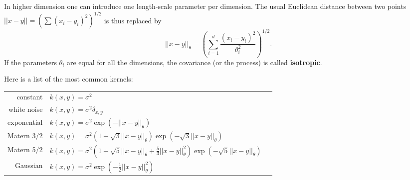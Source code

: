 \documentclass{beamer}
\newcommand\Ni[2]{{|| #1 ||}_{\! #2}}
\begin{document}
\begin{frame}{}
In higher dimension one can introduce one length-scale parameter per dimension. The usual Euclidean distance between two points $|| x-y || = ( \sum (x_i-y_i)^2)^{1/2}$ is thus replaced by
\begin{equation*}
	\Ni{x-y}{\theta} = \left( \sum_{i=1}^d \frac{(x_i-y_i)^2}{\theta_i^2} \right)^{1/2}.
\end{equation*}
If the parameters $\theta_i$ are equal for all the dimensions, the covariance (or the process) is called \textbf{isotropic}.
\end{frame}

\begin{frame}{}
Here is a list of the most common kernels:\\
\vspace{2mm}
\footnotesize
\centering
\begin{tabular}{rlN}
		constant & $ \displaystyle k(x,y) = \sigma^2 $ &\\[4mm]
		white noise & $ \displaystyle k(x,y) = \sigma^2 \delta_{x,y} $ &\\[4mm]
		exponential & $\displaystyle k(x,y) = \sigma^2 \exp \left(- \Ni{x-y}{\theta} \right)$ &\\[4mm]
		Matern 3/2 & $\displaystyle k(x,y) = \sigma^2 \left(1 + \sqrt{3}\Ni{x-y}{\theta} \right) \exp \left(- \sqrt{3}\Ni{x-y}{\theta}  \right)$ &\\[4mm]
		Matern 5/2 & $\displaystyle k(x,y) = \sigma^2 \left(1 + \sqrt{5}\Ni{x-y}{\theta} + \frac{5}{3}\Ni{x-y}{\theta}^2 \right) \exp \left(- \sqrt{5}\Ni{x-y}{\theta} \right)$ &\\[4mm]
		Gaussian & $\displaystyle k(x,y) = \sigma^2 \exp \left(- \frac12 \Ni{x-y}{\theta}^2 \right)$ &\\[4mm]
\end{tabular}
\end{frame}

\end{document}
